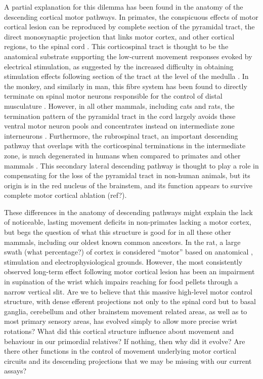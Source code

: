A partial explanation for this dilemma has been found in the anatomy of the descending cortical motor pathways. In primates, the conspicuous effects of motor cortical lesion can be reproduced by complete section of the pyramidal tract, the direct monosynaptic projection that links motor cortex, and other cortical regions, to the spinal cord \cite{Tower1940,Lawrence1968}. This corticospinal tract is thought to be the anatomical substrate supporting the low-current movement responses evoked by electrical stimulation, as suggested by the increased difficulty in obtaining stimulation effects following section of the tract at the level of the medulla \cite{Woolsey1972}. In the monkey, and similarly in man, this fibre system has been found to directly terminate on spinal motor neurons responsible for the control of distal musculature \cite{Leyton1917,Bernhard1954}. However, in all other mammals, including cats and rats, the termination pattern of the pyramidal tract in the cord largely avoids these ventral motor neuron pools and concentrates instead on intermediate zone interneurons \cite{Kuypers1981,Yang2003}. Furthermore, the rubrospinal tract, an important descending pathway that overlaps with the corticospinal terminations in the intermediate zone, is much degenerated in humans when compared to primates and other mammals \cite{Square1982}. This secondary lateral descending pathway is thought to play a role in compensating for the loss of the pyramidal tract \cite{Lawrence1968a} in non-human animals, but its origin is in the red nucleus of the brainstem, and its function appears to survive complete motor cortical ablation (ref?).

These differences in the anatomy of descending pathways might explain the lack of noticeable, lasting movement deficits in non-primates lacking a motor cortex, but begs the question of what this structure is good for in all these other mammals, including our oldest known common ancestors. In the rat, a large swath (what percentage?) of cortex is considered ``motor'' based on anatomical \cite{Donoghue1982}, stimulation \cite{Donoghue1982,Neafsey1986} and electrophysiological grounds. However, the most consistently observed long-term effect following motor cortical lesion has been an impairment in supination of the wrist which impairs reaching for food pellets through a narrow vertical slit. Are we to believe that this massive high-level motor control structure, with dense efferent projections not only to the spinal cord but to basal ganglia, cerebellum and other brainstem movement related areas, as well as to most primary sensory areas, has evolved simply to allow more precise wrist rotations? What did this cortical structure influence about movement and behaviour in our primordial relatives? If nothing, then why did it evolve? Are there other functions in the control of movement underlying motor cortical circuits and its descending projections that we may be missing with our current assays?

